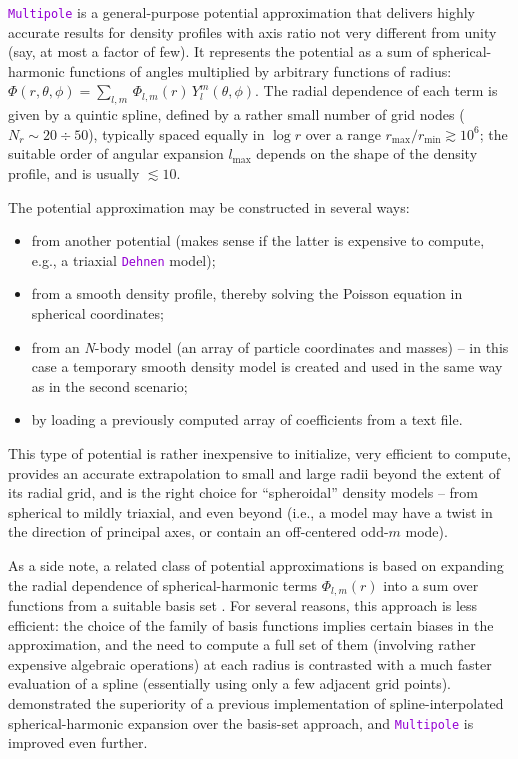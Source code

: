 \documentclass[12pt]{article}
\newcommand{\Nbody}{\textsl{N}-body\xspace}
\newcommand{\ttt}[1]{\textcolor{darkviolet}{\texttt{#1}}}
\begin{document}
\ttt{Multipole} is a general-purpose potential approximation that delivers highly accurate results for density profiles with axis ratio not very different from unity (say, at most a factor of few). It represents the potential as a sum of spherical-harmonic functions of angles multiplied by arbitrary functions of radius: $\Phi(r,\theta,\phi) = \sum_{l,m}\, \Phi_{l,m}(r)\, Y_l^m(\theta,\phi)$. The radial dependence of each term is given by a quintic spline, defined by a rather small number of grid nodes ($N_r\sim 20\div 50$), typically spaced equally in $\log r$ over a range $r_\mathrm{max}/r_\mathrm{min} \gtrsim 10^6$; the suitable order of angular expansion $l_\mathrm{max}$ depends on the shape of the density profile, and is usually $\lesssim 10$.

The potential approximation may be constructed in several ways:
\begin{itemize} \setlength{\parskip}{0pt} \setlength{\itemsep}{2pt}
\item from another potential (makes sense if the latter is expensive to compute, e.g., a triaxial \ttt{Dehnen} model);
\item from a smooth density profile, thereby solving the Poisson equation in spherical coordinates;
\item from an \Nbody model (an array of particle coordinates and masses) -- in this case a temporary smooth density model is created and used in the same way as in the second scenario;
\item by loading a previously computed array of coefficients from a text file.
\end{itemize}

This type of potential is rather inexpensive to initialize, very efficient to compute, provides an accurate extrapolation to small and large radii beyond the extent of its radial grid, and is the right choice for ``spheroidal'' density models -- from spherical to mildly triaxial, and even beyond (i.e., a model may have a twist in the direction of principal axes, or contain an off-centered odd-$m$ mode).

As a side note, a related class of potential approximations is based on expanding the radial dependence of spherical-harmonic terms $\Phi_{l,m}(r)$ into a sum over functions from a suitable basis set \cite{HernquistOstriker1992,Zhao1996}. For several reasons, this approach is less efficient: the choice of the family of basis functions implies certain biases in the approximation, and the need to compute a full set of them (involving rather expensive algebraic operations) at each radius is contrasted with a much faster evaluation of a spline (essentially using only a few adjacent grid points). \cite{Vasiliev2013} demonstrated the superiority of a previous implementation of spline-interpolated spherical-harmonic expansion over the basis-set approach, and \ttt{Multipole} is improved even further. 
\end{document}
